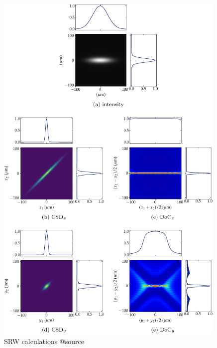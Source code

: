 \documentclass{iucr}              %
\begin{document}
\newpage
\begin{figure}
    \label{fig:CSD_SRW_source}
    \includegraphics[width=0.99\textwidth]{SRW_CSD_source.pdf}
    \caption{SRW calculations @source}
\end{figure}
\end{document}
